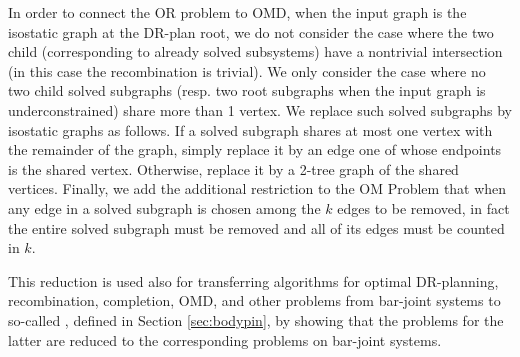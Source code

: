 In order to connect the OR problem to OMD, when the input graph is
the isostatic graph at the DR-plan root, we do not consider the case
where the two child  (corresponding to already
solved subsystems) have a nontrivial intersection (in this case the
recombination is trivial). We only consider the case where no two
child solved subgraphs (resp. two root subgraphs when the input graph
is underconstrained) share more than 1 vertex. We replace such solved
subgraphs  by isostatic graphs as follows. If a solved subgraph shares
at most one vertex with the remainder of the graph, simply replace it
by an edge one of whose endpoints  is the shared vertex. Otherwise,
replace it by  a 2-tree graph of the shared vertices. Finally, we add
the additional restriction to the OM Problem that when any edge in a
solved subgraph is chosen among the $k$ edges to be removed, in fact
the entire solved subgraph must be removed  and all of its edges must
be counted in $k$.

This reduction is used also for transferring  algorithms for optimal
DR-planning, recombination, completion, OMD, and other problems
from bar-joint systems to
so-called , defined in Section \ref{sec:bodypin},
by showing that the problems for the latter are reduced
to the corresponding problems on bar-joint systems.

